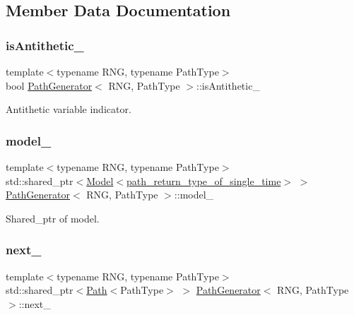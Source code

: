 \subsection{Member Data Documentation}
\hypertarget{class_path_generator_a936af20e588195ca95d02cc302ea5d8b}{}\label{class_path_generator_a936af20e588195ca95d02cc302ea5d8b} 
\subsubsection{\texorpdfstring{is\+Antithetic\+\_\+}{isAntithetic\_}}
{\footnotesize\ttfamily template$<$typename R\+NG, typename Path\+Type$>$ \\
bool \hyperlink{class_path_generator}{Path\+Generator}$<$ R\+NG, Path\+Type $>$\+::is\+Antithetic\+\_\+\hspace{0.3cm}{\ttfamily [private]}}



Antithetic variable indicator. 

\hypertarget{class_path_generator_a92eef9405a03784534b561f56080ed8b}{}\label{class_path_generator_a92eef9405a03784534b561f56080ed8b} 
\subsubsection{\texorpdfstring{model\+\_\+}{model\_}}
{\footnotesize\ttfamily template$<$typename R\+NG, typename Path\+Type$>$ \\
std\+::shared\+\_\+ptr$<$\hyperlink{class_model}{Model}$<$\hyperlink{class_path_generator_a467bc3ddaa5e9104170550617e767349}{path\+\_\+return\+\_\+type\+\_\+of\+\_\+single\+\_\+time}$>$ $>$ \hyperlink{class_path_generator}{Path\+Generator}$<$ R\+NG, Path\+Type $>$\+::model\+\_\+\hspace{0.3cm}{\ttfamily [private]}}



Shared\+\_\+ptr of model. 

\hypertarget{class_path_generator_a2a085e303b74fbc34f12161eed56c331}{}\label{class_path_generator_a2a085e303b74fbc34f12161eed56c331} 
\subsubsection{\texorpdfstring{next\+\_\+}{next\_}}
{\footnotesize\ttfamily template$<$typename R\+NG, typename Path\+Type$>$ \\
std\+::shared\+\_\+ptr$<$\hyperlink{class_path}{Path}$<$Path\+Type$>$ $>$ \hyperlink{class_path_generator}{Path\+Generator}$<$ R\+NG, Path\+Type $>$\+::next\+\_\+\hspace{0.3cm}{\ttfamily [private]}}



